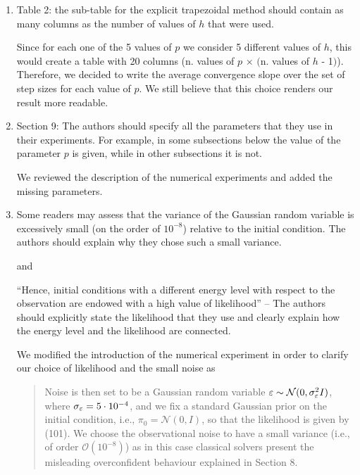 \documentclass[10pt]{article}
\begin{document}
\begin{enumerate}
	\item 
	\begin{itquote}
		Table 2: the sub-table for the explicit trapezoidal method should contain as many columns as the number of values of $h$ that were used.
	\end{itquote}
	Since for each one of the 5 values of $p$ we consider 5 different values of $h$, this would create a table with 20 columns (n. values of $p$ $\times$ $($n. values of $h$ - 1$)$). Therefore, we decided to write the average convergence slope over the set of step sizes for each value of $p$. We still believe that this choice renders our result more readable.
	\item 
	\begin{itquote}
		Section 9: The authors should specify all the parameters that they use in their experiments. For example, in some subsections below the value of the parameter $p$ is given, while in other subsections it is not. 
	\end{itquote}
	We reviewed the description of the numerical experiments and added the missing parameters.
	\item
	\begin{itquote}
		Some readers may assess that the variance of the Gaussian random variable is excessively small (on the order of $10^{-8}$) relative to the initial condition. The authors should explain why they chose such a small variance.
	\end{itquote}
	and
	\begin{itquote}
		``Hence, initial conditions with a different energy level with respect to the observation are endowed with a high value of likelihood'' -- The authors should explicitly state the likelihood that they use and clearly explain how the energy level and the likelihood are connected.
	\end{itquote}
	We modified the introduction of the numerical experiment in order to clarify our choice of likelihood and the small noise as
	\begin{quote}
		Noise is then set to be a Gaussian random variable $\varepsilon \sim \mathcal{N}(0, \sigma_\varepsilon^2 I)$, where $\sigma_\varepsilon = 5 \cdot 10^{-4}$, and we fix a standard Gaussian prior on the initial condition, i.e., $\pi_0 = \mathcal N(0, I)$, so that the likelihood is given by (101). We choose the observational noise to have a small variance (i.e., of order $\mathcal O(10^{-8})$) as in this case classical solvers present the misleading overconfident behaviour explained in Section 8.
	\end{quote}

\end{enumerate}
\end{document}
